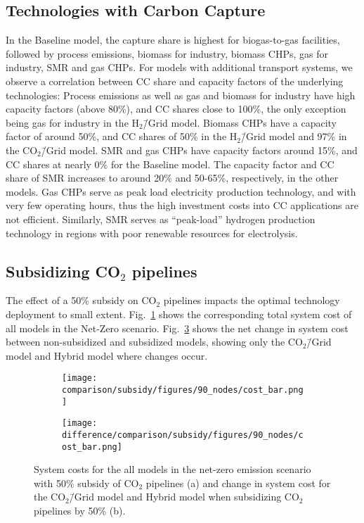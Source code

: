 \documentclass[twocolumn]{article}
\newcommand{\modBase}{Baseline model}
\newcommand{\modCO}{CO$_2$\=/Grid model}
\newcommand{\modH}{H$_2$\=/Grid model}
\newcommand{\carbon}{CO$_2$}
\newcommand{\baselinemodel}{Baseline model}
\newcommand{\carbonmodel}{CO$_2$\=/Grid model}
\newcommand{\hybridmodel}{Hybrid model}
\begin{document}
\subsection{Technologies with Carbon Capture}

In the \modBase{}, the capture share is highest for biogas-to-gas facilities, followed by process emissions, biomass for industry, biomass CHPs, gas for industry, SMR and gas CHPs. For models with additional transport systems, we observe a correlation between CC share and capacity factors of the underlying technologies: Process emissions as well as gas and biomass for industry have high capacity factors (above 80\%), and CC shares close to 100\%, the only exception being gas for industry in the \modH{}. Biomass CHPs have a capacity factor of around 50\%, and CC shares of 50\% in the \modH{} and 97\% in the \modCO{}. SMR and gas CHPs have capacity factors around 15\%, and CC shares at nearly 0\% for the \baselinemodel. The capacity factor and CC share of SMR increases to around 20\% and 50-65\%, respectively, in the other models. Gas CHPs serve as peak load electricity production technology, and with very few operating hours, thus the high investment costs into CC applications are not efficient. Similarly, SMR serves as ``peak-load'' hydrogen production technology in regions with poor renewable resources for electrolysis.



\clearpage
\subsection{Subsidizing \carbon{} pipelines}
\label{sec:subsidy}

The effect of a 50\% subsidy on \carbon{} pipelines impacts the optimal technology deployment to small extent. Fig.~\ref{fig:cost_bar_subsidy} shows the corresponding total system cost of all models in the Net-Zero scenario. Fig.~\ref{fig:cost_bar_diff_subsidy} shows the net change in system cost between non-subsidized and subsidized models, showing only the \carbonmodel{} and \hybridmodel{} where changes occur.

\begin{figure}[ht!]
    \centering
    \begin{subfigure}{.5\textwidth}
    \texttt{[image: comparison/subsidy/figures/90\_nodes/cost\_bar.png]}
    \caption{}
    \label{fig:cost_bar_subsidy}
\end{subfigure}%
\begin{subfigure}{.5\textwidth}
    \centering
    \texttt{[image: difference/comparison/subsidy/figures/90\_nodes/cost\_bar.png]}
    \caption{}
    \label{fig:cost_bar_diff_subsidy}
\end{subfigure}
\caption{System costs for the all models in the net-zero emission scenario with 50\% subsidy of \carbon{} pipelines (a) and change in system cost for the \carbonmodel{} and \hybridmodel{} when subsidizing \carbon{} pipelines by 50\% (b).}
\end{figure}
\end{document}
